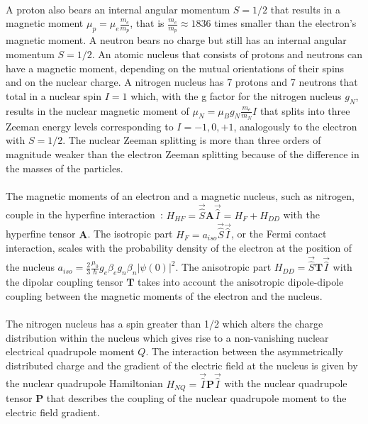 \paragraph*{}
A proton also bears an internal angular momentum $S=1/2$ that results in a magnetic moment $\mu_p = \mu_e\frac{m_e}{m_p}$, that is $\frac{m_e}{m_p}\approx1836$ times smaller than the electron's magnetic moment. A neutron bears no charge but still has an internal angular momentum $S=1/2$. An atomic nucleus that consists of protons and neutrons can have a magnetic moment, depending on the mutual orientations of their spins and on the nuclear charge. A nitrogen nucleus has 7 protons and 7 neutrons that total in a nuclear spin $I=1$ which, with the g factor for the nitrogen nucleus $g_N$, results in the nuclear magnetic moment of $\mu_N=\mu_Bg_N\frac{m_e}{m_N}I$ that splits into three Zeeman energy levels corresponding to $I=-1,0,+1$, analogously to the electron with $S=1/2$. The nuclear Zeeman splitting is more than three orders of magnitude weaker than the electron Zeeman splitting because of the difference in the masses of the particles.

\paragraph*{}
The magnetic moments of an electron and a magnetic nucleus, such as nitrogen, couple in the hyperfine interaction~\cite{Schweiger2001_hfi}: $H_{HF}=\vec{\hat{S}}\textbf{A}\vec{\hat{I}}=H_F+H_{DD}$ with the hyperfine tensor $\textbf{A}$. The isotropic part $H_F=a_{iso}\vec{\hat{S}}\vec{\hat{I}}$, or the Fermi contact interaction, scales with the probability density of the electron at the position of the nucleus $a_{iso}=\frac{2}{3}\frac{\mu_0}{\hbar}g_e\beta_eg_n\beta_n\vert\psi(0)\vert^2$. The anisotropic part $H_{DD}=\vec{\hat{S}}\textbf{T}\vec{\hat{I}}$ with the dipolar coupling tensor $\textbf{T}$ takes into account the anisotropic dipole-dipole coupling between the magnetic moments of the electron and the nucleus.

\paragraph*{}
The nitrogen nucleus has a spin greater than 1/2 which alters the charge distribution within the nucleus which gives rise to a non-vanishing nuclear electrical quadrupole moment $Q$. The interaction between the asymmetrically distributed charge and the gradient of the electric field at the nucleus is given by the nuclear quadrupole Hamiltonian $H_{NQ}=\vec{\hat{I}}\textbf{P}\vec{\hat{I}}$ with the nuclear quadrupole tensor $\textbf{P}$ that describes the coupling of the nuclear quadrupole moment to the electric field gradient.

